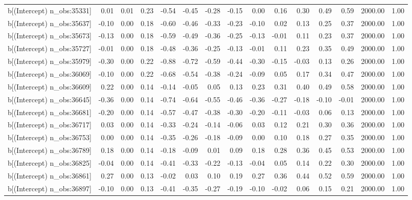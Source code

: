 \begin{table}[ht]
\begin{tabular}{rrrrrrrrrrrrrrr}
  b[(Intercept) n\_obs:35331] & 0.01 & 0.01 & 0.23 & -0.54 & -0.45 & -0.28 & -0.15 & 0.00 & 0.16 & 0.30 & 0.49 & 0.59 & 2000.00 & 1.00 \\ 
  b[(Intercept) n\_obs:35637] & -0.10 & 0.00 & 0.18 & -0.60 & -0.46 & -0.33 & -0.23 & -0.10 & 0.02 & 0.13 & 0.25 & 0.37 & 2000.00 & 1.00 \\ 
  b[(Intercept) n\_obs:35673] & -0.13 & 0.00 & 0.18 & -0.59 & -0.49 & -0.36 & -0.25 & -0.13 & -0.01 & 0.11 & 0.23 & 0.37 & 2000.00 & 1.00 \\ 
  b[(Intercept) n\_obs:35727] & -0.01 & 0.00 & 0.18 & -0.48 & -0.36 & -0.25 & -0.13 & -0.01 & 0.11 & 0.23 & 0.35 & 0.49 & 2000.00 & 1.00 \\ 
  b[(Intercept) n\_obs:35979] & -0.30 & 0.00 & 0.22 & -0.88 & -0.72 & -0.59 & -0.44 & -0.30 & -0.15 & -0.03 & 0.13 & 0.26 & 2000.00 & 1.00 \\ 
  b[(Intercept) n\_obs:36069] & -0.10 & 0.00 & 0.22 & -0.68 & -0.54 & -0.38 & -0.24 & -0.09 & 0.05 & 0.17 & 0.34 & 0.47 & 2000.00 & 1.00 \\ 
  b[(Intercept) n\_obs:36609] & 0.22 & 0.00 & 0.14 & -0.14 & -0.05 & 0.05 & 0.13 & 0.23 & 0.31 & 0.40 & 0.49 & 0.58 & 2000.00 & 1.00 \\ 
  b[(Intercept) n\_obs:36645] & -0.36 & 0.00 & 0.14 & -0.74 & -0.64 & -0.55 & -0.46 & -0.36 & -0.27 & -0.18 & -0.10 & -0.01 & 2000.00 & 1.00 \\ 
  b[(Intercept) n\_obs:36681] & -0.20 & 0.00 & 0.14 & -0.57 & -0.47 & -0.38 & -0.30 & -0.20 & -0.11 & -0.03 & 0.06 & 0.13 & 2000.00 & 1.00 \\ 
  b[(Intercept) n\_obs:36717] & 0.03 & 0.00 & 0.14 & -0.33 & -0.24 & -0.14 & -0.06 & 0.03 & 0.12 & 0.21 & 0.30 & 0.36 & 2000.00 & 1.00 \\ 
  b[(Intercept) n\_obs:36753] & 0.00 & 0.00 & 0.14 & -0.35 & -0.26 & -0.18 & -0.09 & 0.00 & 0.10 & 0.18 & 0.27 & 0.35 & 2000.00 & 1.00 \\ 
  b[(Intercept) n\_obs:36789] & 0.18 & 0.00 & 0.14 & -0.18 & -0.09 & 0.01 & 0.09 & 0.18 & 0.28 & 0.36 & 0.45 & 0.53 & 2000.00 & 1.00 \\ 
  b[(Intercept) n\_obs:36825] & -0.04 & 0.00 & 0.14 & -0.41 & -0.33 & -0.22 & -0.13 & -0.04 & 0.05 & 0.14 & 0.22 & 0.30 & 2000.00 & 1.00 \\ 
  b[(Intercept) n\_obs:36861] & 0.27 & 0.00 & 0.13 & -0.02 & 0.03 & 0.10 & 0.19 & 0.27 & 0.36 & 0.44 & 0.52 & 0.59 & 2000.00 & 1.00 \\ 
  b[(Intercept) n\_obs:36897] & -0.10 & 0.00 & 0.13 & -0.41 & -0.35 & -0.27 & -0.19 & -0.10 & -0.02 & 0.06 & 0.15 & 0.21 & 2000.00 & 1.00 \\ 

\end{tabular}
\end{table}
